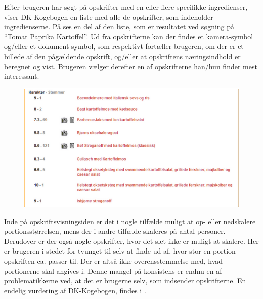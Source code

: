 Efter brugeren har søgt på opskrifter med en eller flere specifikke ingredienser, viser DK-Kogebogen en liste med alle de opskrifter, som indeholder ingredienserne. På  ses en del af den liste, som er resultatet ved søgning på ``Tomat Paprika Kartoffel''. Ud fra opskrifterne kan der findes et kamera-symbol og/eller et dokument-symbol, som respektivt fortæller brugeren, om der er et billede af den pågældende opskrift, og/eller at opskriftens næringsindhold er beregnet og vist. Brugeren vælger derefter en af opskrifterne han/hun finder mest interessant. 

\begin{figure}[H]
\centering
\includegraphics[scale=0.7]{billeder/forbilleder/dk-kogebogen2.png}
\label{fig:dk-kogebogen2}
\end{figure}

Inde på opskriftsvisningsiden er det i nogle tilfælde muligt at op- eller nedskalere portionsstørrelsen, mens der i andre tilfælde skaleres på antal personer. Derudover er der også nogle opskrifter, hvor det slet ikke er muligt at skalere. Her er brugeren i stedet for tvunget til selv at finde ud af, hvor stor en portion opskriften ca. passer til. Der er altså ikke overensstemmelse med, hvad portionerne skal angives i. Denne mangel på konsistens er endnu en af problematikkerne ved, at det er brugerne selv, som indsender opskrifterne. En endelig vurdering af DK-Kogebogen, findes i .
